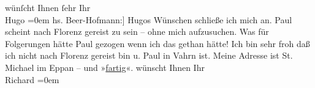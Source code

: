 \begin{ledgroupsized}[t]{13cm}
               wünſcht Ihnen ſehr\pend
           \pstart
           Ihr{\\[\baselineskip]}\spacefill\mbox{Hugo}\pend
           \leftskip=0em{}\pstart
           \noindent{}{[}hs. Beer-Hofmann:{]} Hugos Wünschen schließe ich mich an. Paul scheint nach Florenz gereist zu sein – ohne mich aufzusuchen. Was für
               Folgerungen hätte Paul gezogen wenn ich das
               gethan hätte! Ich bin sehr froh daß ich nicht nach Florenz gereist bin u. Paul in Vahrn ist. Meine Adresse ist St. Michael im Eppan – und »\uline{fartig}«.\pend
           \pstart
           \label{T_L00981_1v}\label{T_L00981_1h} wünscht Ihnen Ihr{\\[\baselineskip]}\spacefill\mbox{Richard}\pend
           \leftskip=0em{}
         
         \endnumbering{}\end{ledgroupsized}  \newcommand{\dateiname}{L00981}\newcommand{\titel}{Hugo von Hofmannsthal und Richard Beer-Hofmann an Arthur Schnitzler, 27. [9. 1899]}\newcommand{\editorInnen}{Martin Anton Müller und Gerd-Hermann Susen}
      